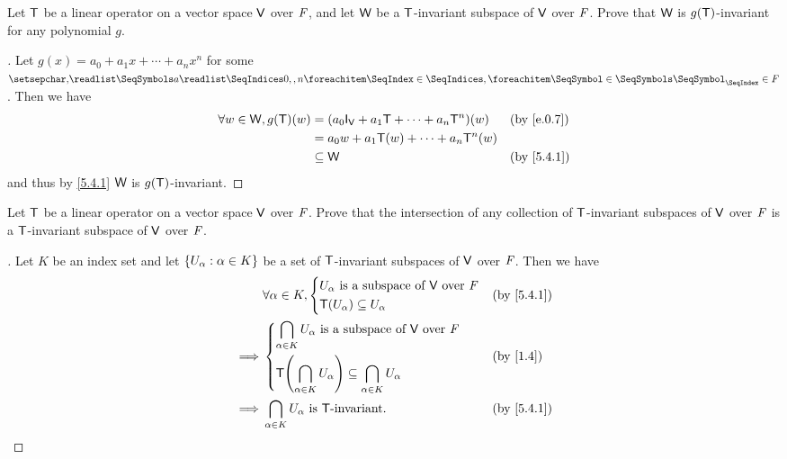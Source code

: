\exercisesection

\setcounter{ex}{3}
\begin{ex}\label{ex:5.4.4}
  Let \(\mathsf{T}\) be a linear operator on a vector space \(\mathsf{V}\) over \(\mathit{F}\), and let \(\mathsf{W}\) be a \(\mathsf{T}\)-invariant subspace of \(\mathsf{V}\) over \(\mathit{F}\).
  Prove that \(\mathsf{W}\) is \(g(\mathsf{T})\)-invariant for any polynomial \(g\).
\end{ex}

\begin{proof}[]
  Let \(g(x) = a_0 + a_1 x + \cdots + a_n x^n\) for some \(\seq{a}{0,,n} \in \F\).
  Then we have
  \begin{align*}
    \forall w \in \W, g(\T)(w) & = (a_0 \IT[\V] + a_1 \T + \cdots + a_n \T^n)(w) &  & \text{(by \cref{e.0.7})} \\
                               & = a_0 w + a_1 \T(w) + \cdots + a_n \T^n(w)                                    \\
                               & \subseteq \W                                    &  & \text{(by \cref{5.4.1})}
  \end{align*}
  and thus by \cref{5.4.1} \(\mathsf{W}\) is \(g(\mathsf{T})\)-invariant.
\end{proof}

\begin{ex}\label{ex:5.4.5}
  Let \(\mathsf{T}\) be a linear operator on a vector space \(\mathsf{V}\) over \(\mathit{F}\).
  Prove that the intersection of any collection of \(\mathsf{T}\)-invariant subspaces of \(\mathsf{V}\) over \(\mathit{F}\) is a \(\mathsf{T}\)-invariant subspace of \(\mathsf{V}\) over \(\mathit{F}\).
\end{ex}

\begin{proof}[]
  Let \(K\) be an index set and let \(\left\lbrace U_{\alpha} : \alpha \in K\right\rbrace\) be a set of \(\mathsf{T}\)-invariant subspaces of \(\mathsf{V}\) over \(\mathit{F}\).
  Then we have
  \begin{align*}
             & \forall \alpha \in K, \begin{dcases}
                                       U_{\alpha} \text{ is a subspace of } \V \text{ over } \F \\
                                       \T(U_{\alpha}) \subseteq U_{\alpha}
                                     \end{dcases}                                               &  & \text{(by \cref{5.4.1})}                          \\
    \implies & \begin{dcases}
                 \bigcap_{\alpha \in K} U_{\alpha} \text{ is a subspace of } \V \text{ over } \F \\
                 \T\pa{\bigcap_{\alpha \in K} U_{\alpha}} \subseteq \bigcap_{\alpha \in K} U_{\alpha}
               \end{dcases} &  & \text{(by \cref{1.4})}                                \\
    \implies & \bigcap_{\alpha \in K} U_{\alpha} \text{ is } \T\text{-invariant}.                                        &  & \text{(by \cref{5.4.1})}
  \end{align*}
\end{proof}

